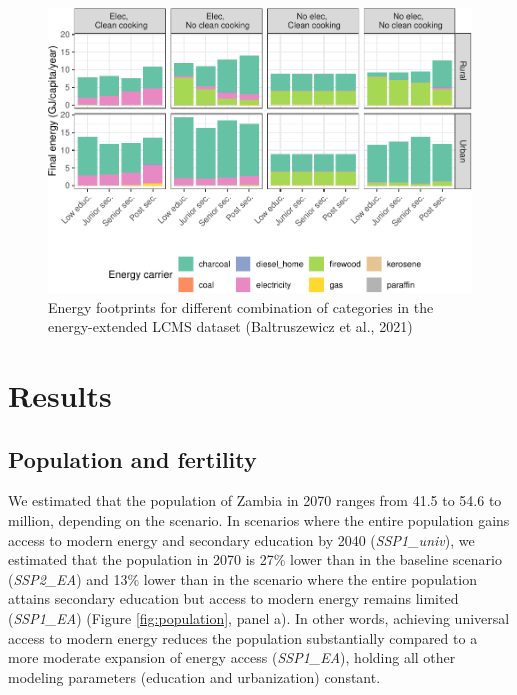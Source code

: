 \documentclass[
]{article}
\begin{document}
\begin{figure}
\centering
\includegraphics{../figures/energy-use-1.pdf}
\caption{\label{fig:energy-use}Energy footprints for different combination of categories in the energy-extended LCMS dataset (Baltruszewicz et al., 2021)}
\end{figure}

\newpage

\hypertarget{results}{%
\section{Results}\label{results}}

\hypertarget{population-and-fertility}{%
\subsection{Population and fertility}\label{population-and-fertility}}

We estimated that the population of Zambia in 2070 ranges from 41.5 to 54.6 to million, depending on the scenario. In scenarios where the entire population gains access to modern energy and secondary education by 2040 (\emph{SSP1\_univ}), we estimated that the population in 2070 is 27\% lower than in the baseline scenario (\emph{SSP2\_EA}) and 13\% lower than in the scenario where the entire population attains secondary education but access to modern energy remains limited (\emph{SSP1\_EA}) (Figure \ref{fig:population}, panel a). In other words, achieving universal access to modern energy reduces the population substantially compared to a more moderate expansion of energy access (\emph{SSP1\_EA}), holding all other modeling parameters (education and urbanization) constant.
\end{document}
